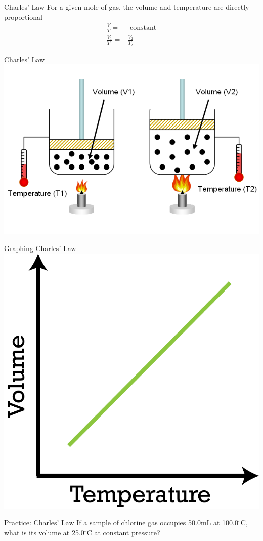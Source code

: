 \documentclass[11pt]{beamer}
\begin{document}
\begin{frame}{Charles' Law}
  For a given mole of gas, the volume and temperature are directly
  proportional
  \begin{align}
    \frac{V}{T} = & \text{ constant} \\
    \frac{V_1}{T_1} = & \frac{V_2}{T_2}
  \end{align}
\end{frame}

\begin{frame}{Charles' Law}
  \centering
  \includegraphics[width=0.9\linewidth]{charles_law}
\end{frame}

\begin{frame}{Graphing Charles' Law}
  \centering
  \includegraphics[width=0.6\linewidth]{charles_graph}
\end{frame}

\begin{frame}{Practice: Charles' Law}
  If a sample of chlorine gas occupies 50.0mL at 100.0$^\circ$C,
  what is its volume at 25.0$^\circ$C at constant pressure?
  
  \vspace{1.5in}
\end{frame}
\end{document}
